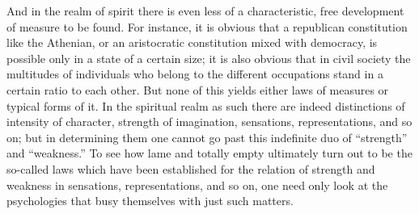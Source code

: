 And in the realm of spirit there is even less of
a characteristic, free development of measure to be found.
For instance, it is obvious that a
republican constitution like the Athenian,
or an aristocratic constitution mixed with democracy,
is possible only in a state of a certain size;
it is also obvious that in civil society
the multitudes of individuals who belong to
the different occupations stand in a certain ratio to each other.
But none of this yields either laws of measures or typical forms of it.
In the spiritual realm as such there are indeed
distinctions of intensity of character,
strength of imagination, sensations, representations, and so on;
but in determining them one cannot go past this indefinite duo of
“strength” and “weakness.”
To see how lame and totally empty ultimately turn out to be
the so-called laws which have been established for
the relation of strength and weakness in sensations,
representations, and so on, one need only look at
the psychologies that busy themselves with just such matters.
